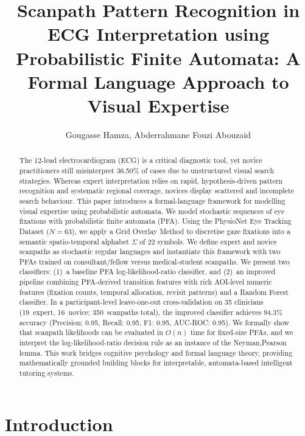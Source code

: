 \documentclass[sigconf]{acmart}
\title[Scanpath Pattern Recognition in ECG Interpretation]{Scanpath Pattern Recognition in ECG Interpretation using Probabilistic Finite Automata: A Formal Language Approach to Visual Expertise}
\author{Gougasse Hamza, Abderrahmane Fouzi Abouzaid}
\affiliation{%
  \institution{Mohammed VI Polytechnic University}
  \city{Rabat}
  \country{Morocco}
}
\theoremstyle{plain}
\theoremstyle{definition}
\begin{document}
\begin{abstract}
The 12-lead electrocardiogram (ECG) is a critical diagnostic tool, yet novice practitioners still misinterpret 36,50\% of cases due to unstructured visual search strategies.
Whereas expert interpretation relies on rapid, hypothesis-driven pattern recognition and systematic regional coverage, novices display scattered and incomplete search behaviour.
This paper introduces a formal-language framework for modelling visual expertise using probabilistic automata.
We model stochastic sequences of eye fixations with probabilistic finite automata (PFA).
Using the PhysioNet Eye Tracking Dataset ($N=63$), we apply a Grid Overlay Method to discretise gaze fixations into a semantic spatio-temporal alphabet $\Sigma$ of 22 symbols.
We define expert and novice scanpaths as stochastic regular languages and instantiate this framework with two PFAs trained on consultant/fellow versus medical-student scanpaths.
We present two classifiers: (1)~a baseline PFA log-likelihood-ratio classifier, and (2)~an improved pipeline combining PFA-derived transition features with rich AOI-level numeric features (fixation counts, temporal allocation, revisit patterns) and a Random Forest classifier.
In a participant-level leave-one-out cross-validation on 35 clinicians (19~expert, 16~novice; 350~scanpaths total), the improved classifier achieves 94.3\% accuracy (Precision: 0.95, Recall: 0.95, F1: 0.95, AUC-ROC: 0.95).
We formally show that scanpath likelihoods can be evaluated in $O(n)$ time for fixed-size PFAs, and we interpret the log-likelihood-ratio decision rule as an instance of the Neyman,Pearson lemma.
This work bridges cognitive psychology and formal language theory, providing mathematically grounded building blocks for interpretable, automata-based intelligent tutoring systems.
\end{abstract}

\maketitle

\section{Introduction}
\end{document}
